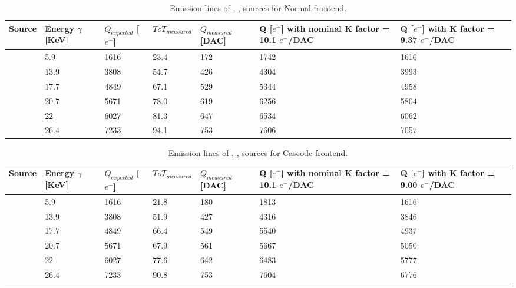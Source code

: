 \begin{table}[h!]
\centering
\begin{tabular}{>{} C{1.8cm}|C{1.8cm}|C{1.8cm}|C{1.8cm}|C{1.8cm}|C{1.8cm}|C{1.8cm}}
Source & Energy $\gamma$ [KeV] & $Q_{expected}$ [$e^{-}$] & $ToT_{measured}$ & $Q_{measured}$ [DAC] & Q [$e^{-}$] \footnotesize{with nominal K factor = 10.1 $e^{-}$/DAC} & Q [$e^{-}$] \footnotesize{with  K factor = 9.37 $e^{-}$/DAC}\\[2ex]
\hline
{} & 5.9 & 1616 & 23.4 & 172 & 1742 & 1616 \\[0.5ex]
\hline
{} & 13.9 & 3808 & 54.7 & 426 & 4304 & 3993 \\[0.5ex]
\hline
{} & 17.7 & 4849 & 67.1 & 529 & 5344 & 4958 \\[0.5ex]
\hline
{} & 20.7 & 5671 & 78.0 & 619 & 6256 & 5804 \\[0.5ex]
\hline
{} & 22 & 6027 & 81.3 & 647 & 6534 & 6062 \\[0.5ex]
\hline
{} & 26.4 & 7233 & 94.1 & 753 & 7606 & 7057 \\[0.5ex]
\hline
\end{tabular}
\caption{Emission lines of , ,  sources for Normal frontend.}
\label{tab:source_conv_norm}
\end{table}


\begin{table}[h!]
\centering
\begin{tabular}{>{} C{1.8cm}|C{1.8cm}|C{1.8cm}|C{1.8cm}|C{1.8cm}|C{1.8cm}|C{1.8cm}}
Source & Energy $\gamma$ [KeV] & $Q_{expected}$ [$e^{-}$] & $ToT_{measured}$ & $Q_{measured}$ [DAC] & Q [$e^{-}$] \footnotesize{with nominal K factor = 10.1 $e^{-}$/DAC} & Q [$e^{-}$] \footnotesize{with  K factor = 9.00 $e^{-}$/DAC}\\[2ex]
\hline
{} & 5.9 & 1616 & 21.8 & 180 & 1813 & 1616 \\[0.5ex]
\hline
{} & 13.9 & 3808 & 51.9 & 427 & 4316 & 3846 \\[0.5ex]
\hline
{} & 17.7 & 4849 & 66.4 & 549 & 5540 & 4937 \\[0.5ex]
\hline
{} & 20.7 & 5671 & 67.9 & 561 & 5667 & 5050 \\[0.5ex]
\hline
{} & 22 & 6027 & 77.6 & 642 & 6483 & 5777 \\[0.5ex]
\hline
{} & 26.4 & 7233 & 90.8 & 753 & 7604 & 6776 \\[0.5ex]
\hline
\end{tabular}
\caption{Emission lines of , ,  sources for Cascode frontend.}
\label{tab:source_conv_casc}
\end{table}


